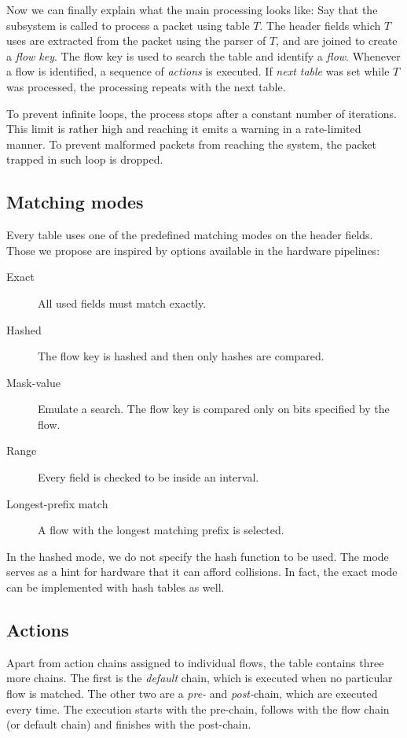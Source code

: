 Now we can finally explain what the main processing looks like: Say that
the subsystem is called to process a packet using table $T$. The header fields
which $T$ uses are extracted from the packet using the parser of $T$, and are
joined to create a \emph{flow key}. The flow key is used to search the table
and identify a \emph{flow}. Whenever a flow is identified, a sequence of
\emph{actions} is executed. If \emph{next table} was set while $T$ was processed,
the processing repeats with the next table.

To prevent infinite loops, the process stops after a constant number of
iterations. This limit is rather high and reaching it emits a warning in
a rate-limited manner. To prevent malformed packets from reaching the system,
the packet trapped in such loop is dropped.

\subsection{Matching modes}

Every table uses one of the predefined matching modes on the header fields. Those we
propose are inspired by options available in the hardware pipelines:

\begin{description}
\item[Exact] All used fields must match exactly.
\item[Hashed] The flow key is hashed and then only hashes are compared.
\item[Mask-value] Emulate a  search. The flow key is compared only on
bits specified by the flow.
\item[Range] Every field is checked to be inside an interval.
\item[Longest-prefix match] A flow with the longest matching prefix is selected.
\end{description}

In the hashed mode, we do not specify the hash function to be used. The mode
serves as a hint for hardware that it can afford collisions. In fact, the exact
mode can be implemented with hash tables as well.

\subsection{Actions}

Apart from action chains assigned to individual flows, the table contains three
more chains. The first is the \emph{default} chain, which is executed when no
particular flow is matched. The other two are a \emph{pre-} and
\emph{post-}chain, which are executed every time. The execution starts with the
pre-chain, follows with the flow chain (or default chain) and finishes with
the post-chain.

